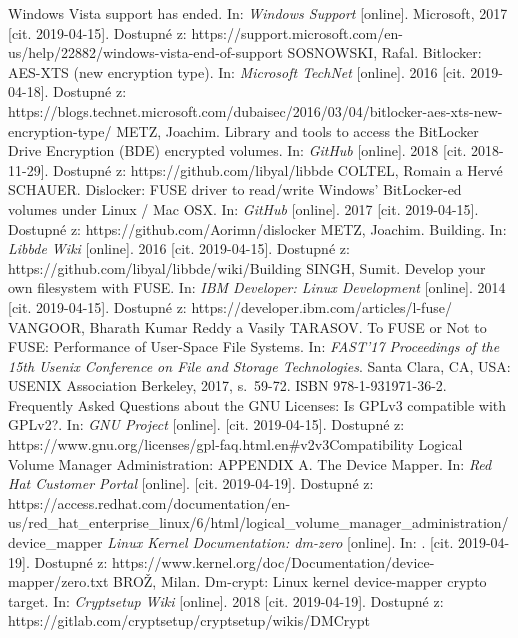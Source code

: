 \documentclass[a4paper,12pt]{article}
\begin{document}
{
Windows Vista support has ended. In: \textit{Windows Support} [online]. Microsoft, 2017 [cit. 2019-04-15]. Dostupné z: https://support.microsoft.com/en-us/help/22882/windows-vista-end-of-support
SOSNOWSKI, Rafal. Bitlocker: AES-XTS (new encryption type). In: \textit{Microsoft TechNet} [online]. 2016 [cit. 2019-04-18]. Dostupné z: https://blogs.technet.microsoft.com/dubaisec/2016/03/04/bitlocker-aes-xts-new-encryption-type/
METZ, Joachim. Library and tools to access the BitLocker Drive Encryption (BDE) encrypted volumes. In: \textit{GitHub} [online]. 2018 [cit. 2018-11-29]. Dostupné z: https://github.com/libyal/libbde
COLTEL, Romain a Hervé SCHAUER. Dislocker: FUSE driver to read/write Windows' BitLocker-ed volumes under Linux / Mac OSX. In: \textit{GitHub} [online]. 2017 [cit. 2019-04-15]. Dostupné z: https://github.com/Aorimn/dislocker
METZ, Joachim. Building. In: \textit{Libbde Wiki} [online]. 2016 [cit. 2019-04-15]. Dostupné z: https://github.com/libyal/libbde/wiki/Building
SINGH, Sumit. Develop your own filesystem with FUSE. In: \textit{IBM Developer: Linux Development} [online]. 2014 [cit. 2019-04-15]. Dostupné z: https://developer.ibm.com/articles/l-fuse/
VANGOOR, Bharath Kumar Reddy a Vasily TARASOV. To FUSE or Not to FUSE: Performance of User-Space File Systems. In: \textit{FAST'17 Proceedings of the 15th Usenix Conference on File and Storage Technologies}. Santa Clara, CA, USA: USENIX Association Berkeley, 2017, s.~59-72. ISBN 978-1-931971-36-2.
Frequently Asked Questions about the GNU Licenses: Is GPLv3 compatible with GPLv2?. In: \textit{GNU Project} [online]. [cit. 2019-04-15]. Dostupné z: https://www.gnu.org/licenses/gpl-faq.html.en\#v2v3Compatibility
Logical Volume Manager Administration: APPENDIX A. The Device Mapper. In: \textit{Red Hat Customer Portal} [online]. [cit. 2019-04-19]. Dostupné z: https://access.redhat.com/documentation/en-us/red\_hat\_enterprise\_linux/6/html/logical\_volume\_manager\_administration/\\device\_mapper
\textit{Linux Kernel Documentation: dm-zero} [online]. In: . [cit. 2019-04-19]. Dostupné z: https://www.kernel.org/doc/Documentation/device-mapper/zero.txt
BROŽ, Milan. Dm-crypt: Linux kernel device-mapper crypto target. In: \textit{Cryptsetup Wiki} [online]. 2018 [cit. 2019-04-19]. Dostupné z: https://gitlab.com/cryptsetup/cryptsetup/wikis/DMCrypt
}
\end{document}
